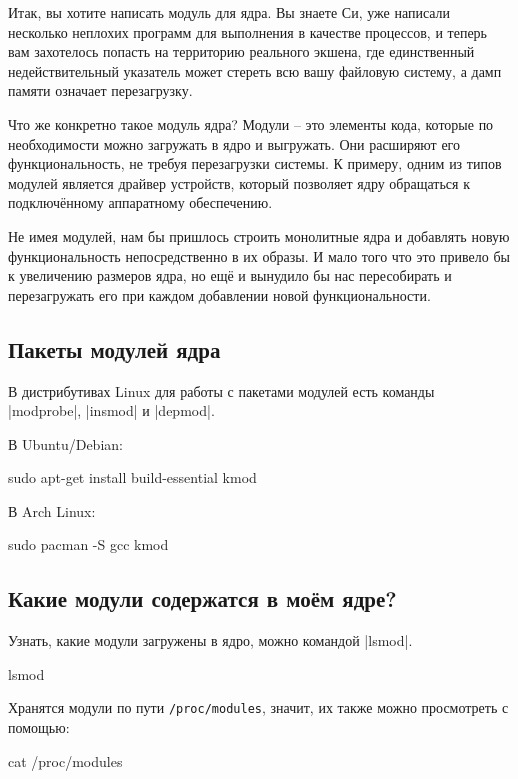 \documentclass[10pt, oneside]{book}
\begin{document}
Итак, вы хотите написать модуль для ядра. Вы знаете Си, уже написали несколько неплохих программ для выполнения в качестве процессов, и теперь вам захотелось попасть на территорию реального экшена, где единственный недействительный указатель может стереть всю вашу файловую систему, а дамп памяти означает перезагрузку.

Что же конкретно такое модуль ядра? Модули – это элементы кода, которые по необходимости можно загружать в ядро и выгружать. Они расширяют его
функциональность, не требуя перезагрузки системы. К примеру, одним из типов модулей является драйвер устройств, который позволяет ядру обращаться к подключённому аппаратному обеспечению.

Не имея модулей, нам бы пришлось строить монолитные ядра и добавлять новую функциональность непосредственно в их образы. И мало того что это привело бы к
увеличению размеров ядра, но ещё и вынудило бы нас пересобирать и перезагружать его при каждом добавлении новой функциональности.

\subsection{Пакеты модулей ядра}
\label{sec:packages}

В дистрибутивах Linux для работы с пакетами модулей есть команды \sh|modprobe|, \sh|insmod| и \sh|depmod|.

В Ubuntu/Debian:
\begin{codebash}
sudo apt-get install build-essential kmod
\end{codebash}

В Arch Linux:
\begin{codebash}
sudo pacman -S gcc kmod
\end{codebash}

\subsection{Какие модули содержатся в моём ядре?}
\label{sec:modutils}

Узнать, какие модули загружены в ядро, можно командой \sh|lsmod|.
\begin{codebash}
lsmod
\end{codebash}

Хранятся модули по пути \verb|/proc/modules|, значит, их также можно просмотреть с помощью:
\begin{codebash}
cat /proc/modules
\end{codebash}
\end{document}
